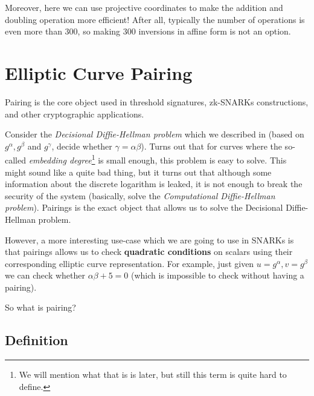 \documentclass[../lecture-notes.tex]{subfiles}
\begin{document}
Moreover, here we can use projective coordinates to make the addition and doubling operation more efficient! After all, typically the number of operations is even more than $300$, so making $300$ inversions in affine form is not an option.

\section{Elliptic Curve Pairing}\label{section:ecpairing}

Pairing is the core object used in threshold signatures, zk-SNARKs constructions, and other cryptographic applications. 

Consider the \textit{Decisional Diffie-Hellman problem} which we described in  (based on $g^{\alpha},g^{\beta}$ and $g^{\gamma}$, decide whether $\gamma = \alpha\beta$). Turns out that for curves where the so-called \textit{embedding degree}\footnote{We will mention what that is is later, but still this term is quite hard to define.} is small enough, this problem is easy to solve. This might sound 
like a quite bad thing, but it turns out that although some information about the discrete logarithm is leaked, it is not enough to break the security of the system (basically, solve the \textit{Computational Diffie-Hellman problem}). 
Pairings is the exact object that allows us to solve the Decisional Diffie-Hellman problem.

However, a more interesting use-case which we are going to use in SNARKs is that pairings allows us to check \textbf{quadratic conditions} on scalars using their corresponding elliptic curve representation. For example, just given $u=g^{\alpha},v=g^{\beta}$ we can check whether $\alpha\beta+5=0$ (which is impossible to check without having a pairing). 

So what is pairing?

\subsection{Definition}
\end{document}
